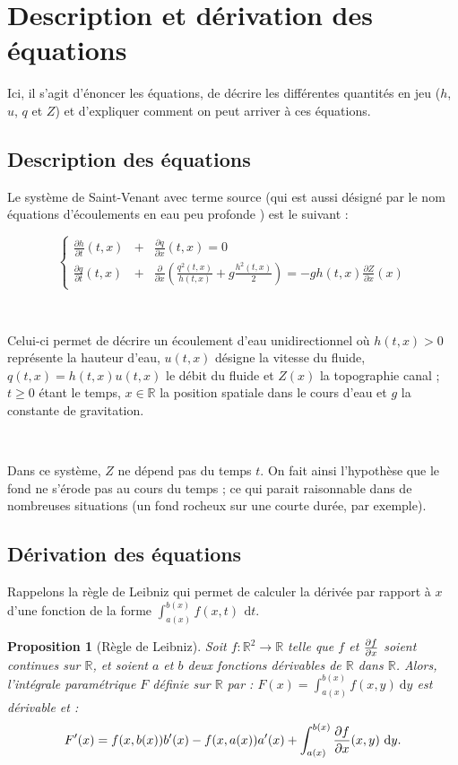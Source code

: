 \documentclass[
11pt, %
francais, %
singlespacing, %
headsepline, %
]{MastersDoctoralThesis} %
\newtheorem{prop}{Proposition}
\begin{document}
\newpage

\section{Description et dérivation des équations}

Ici, il s'agit  d'énoncer les équations, de décrire les différentes quantités en jeu ($h$, $u$, $q$ et $Z$)
et d'expliquer comment on peut arriver à ces équations.

\subsection{Description des équations}

Le système de Saint-Venant avec terme source (qui est aussi désigné par le nom \og équations d'écoulements en eau peu profonde  \fg{}) est le suivant :

$$
\left \{
\begin{array}{rcl}
\frac{\partial h}{\partial t}(t,x)&+&\frac{\partial q}{\partial x}(t,x)=0\ \\ 
\frac{\partial q}{\partial t}(t,x)&+&\frac{\partial}{\partial x}(\frac{q^{2}(t,x)}{h(t,x)}+g\frac{h^{2}(t,x)}{2})=-gh(t,x)\frac{\partial Z}{\partial x}(x) \label{deuxeq}
\end{array}
\right.
$$

\

Celui-ci permet de décrire un écoulement d'eau unidirectionnel où $h(t,x)>0$ représente la hauteur d'eau, $u(t,x)$ désigne la vitesse du fluide, $q(t,x)=h(t,x)u(t,x)$ le débit du fluide et $Z(x)$ la topographie canal ; $t\geq0$ étant le temps, $x\in\mathbb{R}$ la position spatiale dans le cours d'eau et $g$ la constante de gravitation.

\

Dans ce système, $Z$ ne dépend pas du temps $t$. On
fait ainsi l'hypothèse que le fond ne s'érode pas au cours du temps ; ce qui parait raisonnable dans de nombreuses situations (un fond rocheux sur une courte durée, par exemple).

\subsection{Dérivation des équations}

Rappelons la règle de Leibniz qui permet de calculer la dérivée par rapport à $x$ d'une fonction de la forme $\int_{a(x)}^{b(x)} f(x,t)\,~\mathrm dt$.

\begin{prop}[Règle de Leibniz]
Soit $f : \mathbb{R}^{2} \rightarrow\mathbb{R}$ telle que $f$ et ${\partial f\over\partial x}$ soient continues sur $\mathbb{R}$, et soient $a$ et $b$ deux fonctions dérivables de $\mathbb{R}$ dans $\mathbb{R}$. Alors, l'intégrale paramétrique $F$ définie sur $\mathbb{R}$ par : $F(x)=\int_{a(x)}^{b(x)}f(x,y)~\mathrm dy$ est dérivable et :
\begin{equation}
F'(x)=f(x, b(x))b'(x)-f(x,a(x))a'(x)+\int_{a(x)}^{b(x)}{\partial f\over \partial x}(x,y)~\mathrm dy.
\end{equation}
\end{prop}
\end{document}
